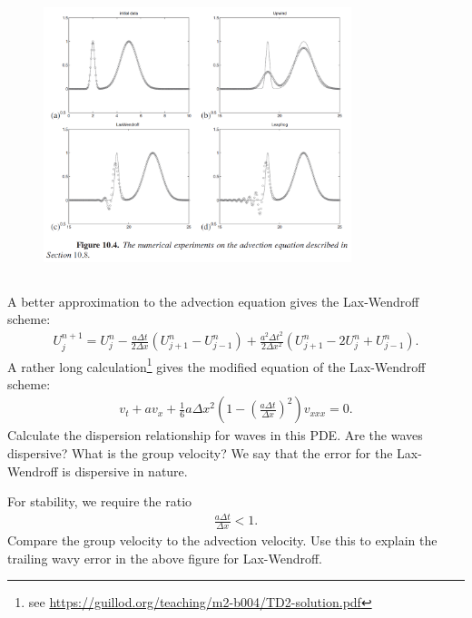 \documentclass[11pt,letterpaper]{article}
\begin{document}
\begin{figure}[H]
    \centering
    \includegraphics[width=0.8\textwidth]{figs/num_dispers}
\end{figure}

\subsection{}
A better approximation to the advection equation gives the Lax-Wendroff scheme:
\begin{align}
    U^{n+1}_j = U^n_j-\frac{a\Delta t}{2\Delta x}\left( U^n_{j+1}-U^n_{j-1} \right)+\frac{a^2 \Delta t^2}{2\Delta x^2}\left(U^n_{j+1}-2U^n_{j}+U^n_{j-1}\right).
\end{align}
A rather long calculation\footnote{see \url{https://guillod.org/teaching/m2-b004/TD2-solution.pdf}} gives the modified equation of the Lax-Wendroff scheme:
\begin{align}
    v_t+av_x +\frac{1}{6}a\Delta x^2\left(1-\left(\frac{a\Delta t}{\Delta x}\right)^2\right)v_{xxx} = 0.
\end{align}
Calculate the dispersion relationship for waves in this PDE. Are the waves dispersive? What is the group velocity? We say that the error for the Lax-Wendroff is dispersive in nature. 

For stability, we require the ratio
\begin{align}
    \frac{a\Delta t}{\Delta x}<1.
\end{align}
Compare the group velocity to the advection velocity. Use this to explain the trailing wavy error in the above figure for Lax-Wendroff. 
\end{document}

